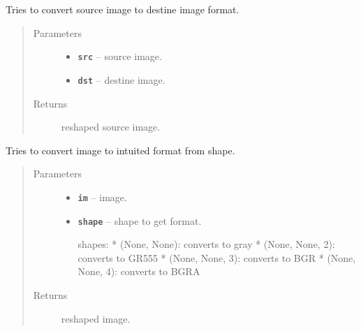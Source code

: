 \documentclass[letterpaper,10pt,english]{sphinxmanual}
\begin{document}

\begin{fulllineitems}
\label{RRtoolbox.lib.arrayops:RRtoolbox.lib.arrayops.basic.im2imFormat}
Tries to convert source image to destine image format.
\begin{quote}\begin{description}
\item[{Parameters}] \leavevmode\begin{itemize}
\item {} 
\textbf{\texttt{src}} -- source image.

\item {} 
\textbf{\texttt{dst}} -- destine image.

\end{itemize}

\item[{Returns}] \leavevmode
reshaped source image.

\end{description}\end{quote}

\end{fulllineitems}


\begin{fulllineitems}
\label{RRtoolbox.lib.arrayops:RRtoolbox.lib.arrayops.basic.im2shapeFormat}
Tries to convert image to intuited format from shape.
\begin{quote}\begin{description}
\item[{Parameters}] \leavevmode\begin{itemize}
\item {} 
\textbf{\texttt{im}} -- image.

\item {} 
\textbf{\texttt{shape}} -- 
shape to get format.

shapes:
* (None, None): converts to gray
* (None, None, 2): converts to GR555
* (None, None, 3): converts to BGR
* (None, None, 4): converts to BGRA


\end{itemize}

\item[{Returns}] \leavevmode
reshaped image.

\end{description}\end{quote}

\end{fulllineitems}
\end{document}

